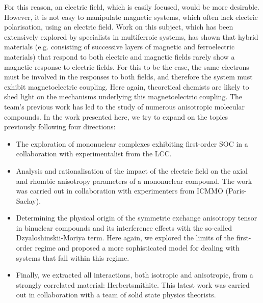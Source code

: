 \documentclass[12pt,a4paper]{report}
\numberwithin{equation}{section}
\begin{document}
For this reason, an electric field, which is easily focused, would be more desirable.
However, it is not easy to manipulate magnetic systems, which often lack electric polarisation, using an electric field.
Work on this subject, which has been extensively explored by specialists in multiferroic systems, has shown that hybrid materials (e.g. consisting of successive layers of magnetic and ferroelectric materials) that respond to both electric and magnetic fields rarely show a magnetic response to electric fields.
For this to be the case, the same electrons must be involved in the responses to both fields, and therefore the system must exhibit magnetoelectric coupling.
Here again, theoretical chemists are likely to shed light on the mechanisms underlying this magnetoelectric coupling.  
The team's previous work has led to the study of numerous anisotropic molecular compounds. 
In the work presented here, we try to expand on the topics previously following four directions:
\begin{itemize}
    \item[-] The exploration of mononuclear complexes exhibiting first-order SOC in a collaboration with experimentalist from the LCC.
    \item[-] Analysis and rationalisation of the impact of the electric field on the axial and rhombic anisotropy parameters of a mononuclear compound. The work was carried out in collaboration with experimenters from ICMMO (Paris-Saclay). 
    \item[-] Determining the physical origin of the symmetric exchange anisotropy tensor in binuclear compounds and its interference effects with the so-called Dzyaloshinskii-Moriya term. Here again, we explored the limits of the first-order regime and proposed a more sophisticated model for dealing with systems that fall within this regime.
    \item[-] Finally, we extracted all interactions, both isotropic and anisotropic, from a strongly correlated material: Herbertsmithite. This latest work was carried out in collaboration with a team of solid state physics theorists.
\end{itemize}
\end{document}

